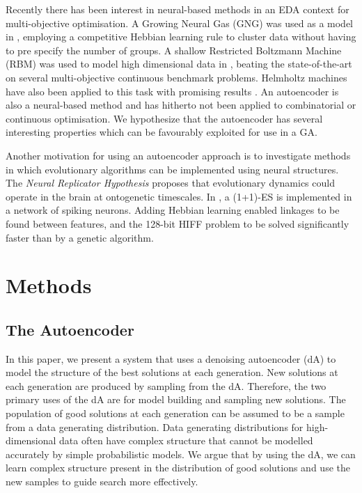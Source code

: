 \documentclass[runningheads,a4paper]{llncs}
\begin{document}
Recently there has been interest in neural-based methods in an EDA context for multi-objective optimisation. A Growing Neural Gas (GNG) was used as a model in \cite{marti2008introducing}, employing a competitive Hebbian learning rule to cluster data without having to pre specify the number of groups. A shallow Restricted Boltzmann Machine (RBM) was used to model high dimensional data in \cite{tang2010restricted}, beating the state-of-the-art on several multi-objective continuous benchmark problems. Helmholtz machines have also been applied to this task with promising results \cite{zhang2000bayesian}. An autoencoder is also a  neural-based method and has hitherto not been applied to combinatorial or continuous optimisation. We hypothesize that the autoencoder has several interesting properties which can be favourably exploited for use in a GA. 

Another motivation for using an autoencoder approach is to investigate methods in which evolutionary algorithms can be implemented using neural structures. The {\em{Neural Replicator Hypothesis}} \cite{fernando2010neuronal} proposes that evolutionary dynamics could operate in the brain at ontogenetic timescales. In \cite{fernando2010neuronal}, a (1+1)-ES is implemented in a network of spiking neurons. Adding Hebbian learning enabled linkages to be found between features, and the 128-bit HIFF problem to be solved significantly faster than by a genetic algorithm. 

\section{Methods}

\subsection{The Autoencoder}

In this paper, we present a system that uses a denoising autoencoder (dA) to model the structure of the best solutions at each generation. New solutions at each generation are produced by sampling from the dA. Therefore, the two primary uses of the dA are for model building and sampling new solutions. The population of good solutions at each generation can be assumed to be a sample from a data generating distribution. Data generating distributions for high-dimensional data often have complex structure that cannot be modelled accurately by simple probabilistic models. We argue that by using the dA, we can learn complex structure present in the distribution of good solutions and use the new samples to guide search more effectively. 
\end{document}

